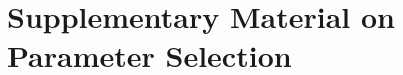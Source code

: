 \documentclass[11pt, twoside, openright]{thesis}
\begin{document}

\cleardoublepage

\printbibliography



\appendix
\chapter{Supplementary Material on Parameter Selection}







\end{document}
